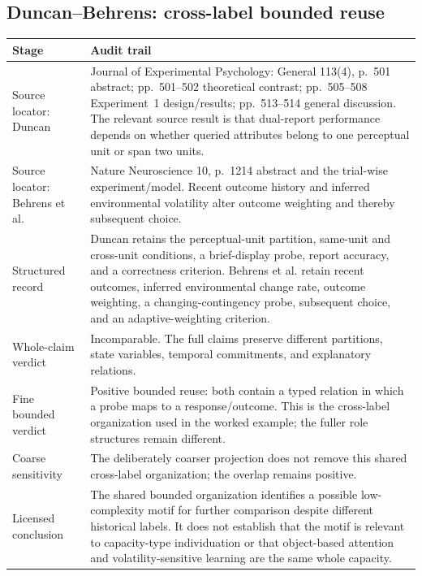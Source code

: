 \documentclass[11pt]{article}
\begin{document}
\subsection{Duncan--Behrens: cross-label bounded reuse}

\begingroup
\small
\begin{tabularx}{\textwidth}{>{\raggedright\arraybackslash}p{} X}
\toprule
Stage & Audit trail \\
\midrule
Source locator: Duncan & Journal of Experimental Psychology: General 113(4), p.~501 abstract; pp.~501--502 theoretical contrast; pp.~505--508 Experiment~1 design/results; pp.~513--514 general discussion. The relevant source result is that dual-report performance depends on whether queried attributes belong to one perceptual unit or span two units. \\
Source locator: Behrens et al. & Nature Neuroscience 10, p.~1214 abstract and the trial-wise experiment/model. Recent outcome history and inferred environmental volatility alter outcome weighting and thereby subsequent choice. \\
Structured record & Duncan retains the perceptual-unit partition, same-unit and cross-unit conditions, a brief-display probe, report accuracy, and a correctness criterion. Behrens et al. retain recent outcomes, inferred environmental change rate, outcome weighting, a changing-contingency probe, subsequent choice, and an adaptive-weighting criterion. \\
Whole-claim verdict & Incomparable. The full claims preserve different partitions, state variables, temporal commitments, and explanatory relations. \\
Fine bounded verdict & Positive bounded reuse: both contain a typed relation in which a probe maps to a response/outcome. This is the cross-label organization used in the worked example; the fuller role structures remain different. \\
Coarse sensitivity & The deliberately coarser projection does not remove this shared cross-label organization; the overlap remains positive. \\
Licensed conclusion & The shared bounded organization identifies a possible low-complexity motif for further comparison despite different historical labels. It does not establish that the motif is relevant to capacity-type individuation or that object-based attention and volatility-sensitive learning are the same whole capacity. \\
\bottomrule
\end{tabularx}
\endgroup
\end{document}
